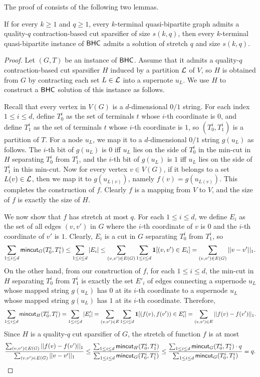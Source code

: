 The proof of  consists of the following two lemmas.

\begin{lemma}
If for every $k\ge 1$ and $q\ge 1$, every $k$-terminal quasi-bipartite graph admits a quality-$q$ contraction-based cut sparsifier of size $s(k,q)$, then every $k$-terminal quasi-bipartite instance of $\textnormal{\textsf{BHC}}$ admits a solution of stretch $q$ and size $s(k,q)$.
\end{lemma}

\begin{proof}
Let $(G,T)$ be an instance of $\textnormal{\textsf{BHC}}$. Assume that it admits a quality-$q$ contraction-based cut sparsifier $H$ induced by a partition ${\mathcal{L}}$ of $V$, so $H$ is obtained from $G$ by contracting each set $L\in {\mathcal{L}}$ into a supernote $u_L$.
We use $H$ to construct a $\textnormal{\textsf{BHC}}$ solution of this instance as follows.

Recall that every vertex in $V(G)$ is a $d$-dimensional $0/1$ string. For each index $1\le i\le d$, define $T^i_0$ as the set of terminals $t$ whose $i$-th coordinate is $0$, and define $T^i_1$ as the set of terminals $t$ whose $i$-th coordinate is $1$, so $(T^i_0,T^i_1)$ is a partition of $T$. For a node $u_L$, we map it to a $d$-dimensional $0/1$ string $g(u_L)$ as follows. The $i$-th bit of $g(u_L)$ is $0$ iff $u_L$ lies on the side of $T^i_0$ in the min-cut in $H$ separating $T^i_0$ from $T^i_1$, and the $i$-th bit of $g(u_L)$ is $1$ iff $u_L$ lies on the side of $T^i_1$ in this min-cut.
Now for every vertex $v\in V(G)$, if it belongs to a set $L(v)\in {\mathcal{L}}$, then we map it to $g(u_{L(v)})$, namely $f(v)=g(u_{L(v)})$. This completes the construction of $f$. Clearly $f$ is a mapping from $V$ to $V$, and the size of $f$ is exactly the size of $H$.

We now show that $f$ has stretch at most $q$.
For each $1\le i\le d$, we define $E_i$ as the set of all edges $(v,v')$ in $G$ where the $i$-th coordinate of $v$ is $0$ and the $i$-th coordinate of $v'$ is $1$. Clearly, $E_i$ is a cut in $G$ separating $T^i_0$ from $T^i_1$, so
\[
\sum_{1\le i\le d}\mathsf{mincut}_G(T^i_0,T^i_1)\le \sum_{1\le i\le d}|E_i|\le \sum_{(v,v')\in E(G)}\sum_{1\le  i\le d}\mathbf{1}[(v,v')\in E_i]=\sum_{(v,v')\in E(G)}||v-v'||_1.
\]
On the other hand, from our construction of $f$, for each $1\le i\le d$, the min-cut in $H$ separating $T^i_0$ from $T^i_1$ is exactly the set $E'_i$ of edges connecting a supernode $u_L$ whose mapped string $g(u_L)$ has $0$ at its $i$-th coordinate to a supernode $u_L$ whose mapped string $g(u_L)$ has $1$ at its $i$-th coordinate. Therefore, 
\[
\sum_{1\le i\le d}\mathsf{mincut}_H(T^i_0,T^i_1)= \sum_{1\le i\le d}|E'_i|= \sum_{(v,v')\in E}\sum_{1\le  i\le d}\mathbf{1}[(f(v),f(v'))\in E'_i]=\sum_{(v,v')\in E}||f(v)-f(v')||_1.
\]
Since $H$ is a quality-$q$ cut sparsifier of $G$, the stretch of function $f$ is at most
\[
\frac{\sum_{(v,v')\in E(G)}||f(v)-f(v')||_1}{\sum_{(v,v')\in E(G)}||v-v'||_1}\le \frac{\sum_{1\le i\le d}\mathsf{mincut}_H(T^i_0,T^i_1)}{\sum_{1\le i\le d}\mathsf{mincut}_G(T^i_0,T^i_1)}\le \frac{\sum_{1\le i\le d} \mathsf{mincut}_G(T^i_0,T^i_1)\cdot q}{\sum_{1\le i\le d}\mathsf{mincut}_G(T^i_0,T^i_1)}=q.
\]
\end{proof}

